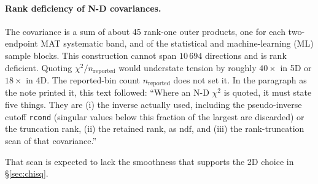 \paragraph{Rank deficiency of N-D covariances.} The covariance is a sum of about 45 rank-one outer products, one for each two-endpoint MAT systematic band, and of the statistical and machine-learning (ML) sample blocks. This construction cannot span $10\,694$ directions and is rank deficient. Quoting $\chi^{2}/n_{\text{reported}}$ would understate tension by roughly $40\times$ in 5D or $18\times$ in 4D. The reported-bin count $n_{\text{reported}}$ does not set it. In the paragraph as the note printed it, this text followed: ``Where an N-D $\chi^{2}$ is quoted, it must state five things. They are (i) the inverse actually used, including the pseudo-inverse cutoff \texttt{rcond} (singular values below this fraction of the largest are discarded) or the truncation rank, (ii) the retained rank, as $\mathrm{ndf}$, and (iii) the rank-truncation scan of that covariance.''\par That scan is expected to lack the smoothness that supports the 2D choice in \S\ref{sec:chisq}.

